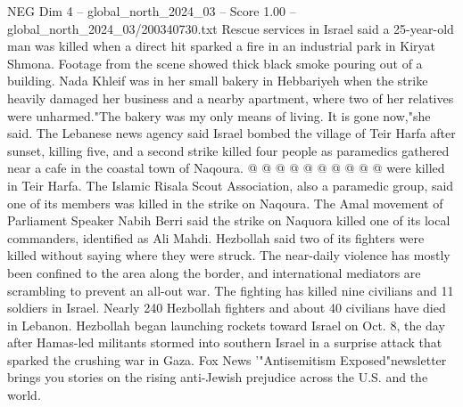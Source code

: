 \begin{textsample}{NEG Dim 4 – global\_north\_2024\_03 – Score 1.00 – global\_north\_2024\_03/200340730.txt}
Rescue services in Israel said a 25-year-old man was killed when a direct hit sparked a fire in an industrial park in Kiryat Shmona.
Footage from the scene showed thick black smoke pouring out of a building.
Nada Khleif was in her small bakery in Hebbariyeh when the strike heavily damaged her business and a nearby apartment, where two of her relatives were unharmed."The bakery was my only means of living.
It is gone now,"she said.
The Lebanese news agency said Israel bombed the village of Teir Harfa after sunset, killing five, and a second strike killed four people as paramedics gathered near a cafe in the coastal town of Naqoura. @ @ @ @ @ @ @ @ @ @ were killed in Teir Harfa.
The Islamic Risala Scout Association, also a paramedic group, said one of its members was killed in the strike on Naqoura.
The Amal movement of Parliament Speaker Nabih Berri said the strike on Naquora killed one of its local commanders, identified as Ali Mahdi.
Hezbollah said two of its fighters were killed without saying where they were struck.
The near-daily violence has mostly been confined to the area along the border, and international mediators are scrambling to prevent an all-out war.
The fighting has killed nine civilians and 11 soldiers in Israel.
Nearly 240 Hezbollah fighters and about 40 civilians have died in Lebanon.
Hezbollah began launching rockets toward Israel on Oct. 8, the day after Hamas-led militants stormed into southern Israel in a surprise attack that sparked the crushing war in Gaza.
Fox News '"Antisemitism Exposed"newsletter brings you stories on the rising anti-Jewish prejudice across the U.S. and the world.

\end{textsample}
